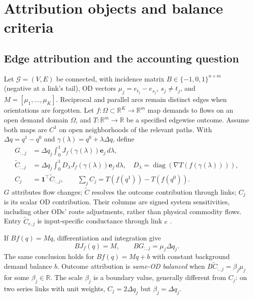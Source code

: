 \documentclass[a4paper,fleqn]{cas-sc}
\newcommand{\R}{\mathbb{R}}
\begin{document}
\section{Attribution objects and balance criteria}\label{sec:objects}
\subsection{Edge attribution and the accounting question}
Let $\mathcal G=(V,E)$ be connected, with incidence matrix
$B\in\{-1,0,1\}^{n\times m}$ (negative at a link's tail), OD vectors
$\mu_j=e_{t_j}-e_{s_j}$, $s_j\ne t_j$, and $M=[\mu_1,\ldots,\mu_K]$.
Reciprocal and parallel arcs remain distinct edges when orientations are
forgotten. Let $f:\Omega\subset\R^K\to\R^m$ map demands to flows on an
open demand domain $\Omega$, and
$T:\R^m\to\R$ be a specified edgewise outcome. Assume both maps are $C^1$
on open neighborhoods of the relevant paths. With $\Delta q=q^1-q^0$ and
$\gamma(\lambda)=q^0+\lambda\Delta q$, define
\begin{align}
G_{:,j}&=\Delta q_j\int_0^1 J_f(\gamma(\lambda))\mathbf e_j\,d\lambda,
\label{eq:Gdef}\\
\widetilde C_{:,j}&=\Delta q_j\int_0^1 D_\lambda J_f(\gamma(\lambda))\mathbf e_j\,d\lambda,
\quad D_\lambda=\operatorname{diag}(\nabla T(f(\gamma(\lambda)))),
\label{eq:Cdef}\\
C_j&=\mathbf1^\top\widetilde C_{:,j},\qquad
\sum_j C_j=T(f(q^1))-T(f(q^0)).\label{eq:Cscalar}
\end{align}
$G$ attributes flow changes; $\widetilde C$ resolves the outcome contribution
through links; $C_j$ is its scalar OD contribution. Their columns are signed
system sensitivities, including other ODs' route adjustments, rather than
physical commodity flows. Entry $\widetilde C_{e,j}$ is input-specific
conductance through link $e$ \citep{dhamdhere2019important}.\label{sec:whyC}

If $Bf(q)=Mq$, differentiation and integration give
\begin{equation}
BJ_f(q)=M,\qquad BG_{:,j}=\mu_j\Delta q_j.\label{eq:anchorchain}
\end{equation}
The same conclusion holds for $Bf(q)=Mq+b$ with constant background demand
balance $b$. Outcome attribution is \emph{same-OD balanced} when
$B\widetilde C_{:,j}=\beta_j\mu_j$ for some $\beta_j\in\R$.
The scale $\beta_j$ is a boundary value, generally different from $C_j$:
on two series links with unit weights, $C_j=2\Delta q_j$ but
$\beta_j=\Delta q_j$.
\end{document}
